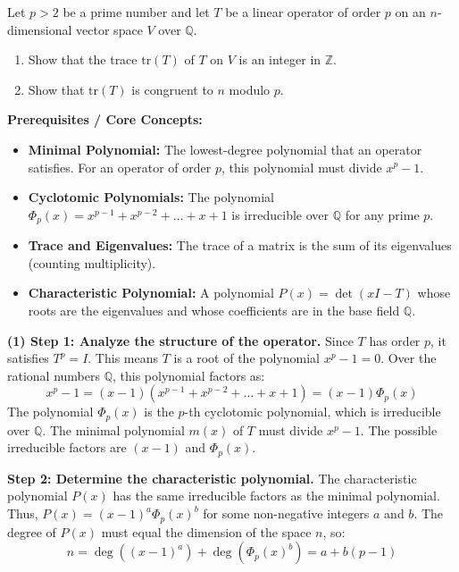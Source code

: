 \begin{exercise}
\label{algebra:2017:7}
Let $p > 2$ be a prime number and let $T$ be a linear operator of order $p$ on an $n$-dimensional vector space $V$ over $\mathbb{Q}$.
\begin{enumerate}
    \item Show that the trace $\mathrm{tr}(T)$ of $T$ on $V$ is an integer in $\mathbb{Z}$.
    \item Show that $\mathrm{tr}(T)$ is congruent to $n$ modulo $p$.
\end{enumerate}
\end{exercise}
\begin{solution}
\textbf{Prerequisites / Core Concepts:}
\begin{itemize}
    \item \textbf{Minimal Polynomial:} The lowest-degree polynomial that an operator satisfies. For an operator of order $p$, this polynomial must divide $x^p - 1$.
    \item \textbf{Cyclotomic Polynomials:} The polynomial $\Phi_p(x) = x^{p-1} + x^{p-2} + \dots + x + 1$ is irreducible over $\mathbb{Q}$ for any prime $p$.
    \item \textbf{Trace and Eigenvalues:} The trace of a matrix is the sum of its eigenvalues (counting multiplicity).
    \item \textbf{Characteristic Polynomial:} A polynomial $P(x) = \det(xI - T)$ whose roots are the eigenvalues and whose coefficients are in the base field $\mathbb{Q}$.
\end{itemize}

\textbf{(1) Step 1: Analyze the structure of the operator.}
Since $T$ has order $p$, it satisfies $T^p = I$. This means $T$ is a root of the polynomial $x^p - 1 = 0$.
Over the rational numbers $\mathbb{Q}$, this polynomial factors as:
\[ x^p - 1 = (x - 1)(x^{p-1} + x^{p-2} + \dots + x + 1) = (x - 1)\Phi_p(x) \]
The polynomial $\Phi_p(x)$ is the $p$-th cyclotomic polynomial, which is irreducible over $\mathbb{Q}$.
The minimal polynomial $m(x)$ of $T$ must divide $x^p - 1$. The possible irreducible factors are $(x-1)$ and $\Phi_p(x)$.

\textbf{Step 2: Determine the characteristic polynomial.}
The characteristic polynomial $P(x)$ has the same irreducible factors as the minimal polynomial.
Thus, $P(x) = (x-1)^a \Phi_p(x)^b$ for some non-negative integers $a$ and $b$.
The degree of $P(x)$ must equal the dimension of the space $n$, so:
\[ n = \deg((x-1)^a) + \deg(\Phi_p(x)^b) = a + b(p-1) \]


\end{solution}
